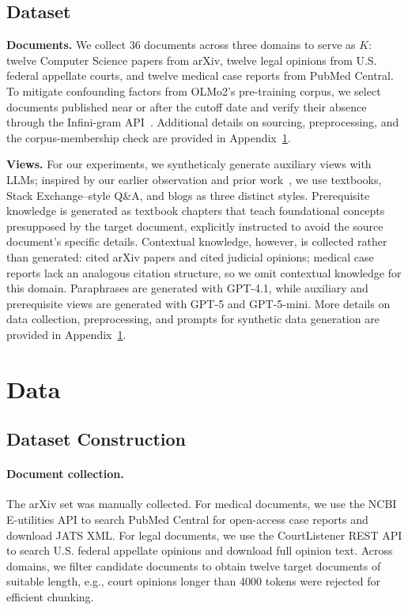 \subsection{Dataset}
\label{sec:dataset}

\textbf{Documents.}
We collect 36 documents across three domains to serve as $K$: twelve Computer Science papers from arXiv, twelve legal opinions from U.S. federal appellate courts, and twelve medical case reports from PubMed Central.  To mitigate confounding factors from OLMo2's pre-training corpus, we select documents published near or after the cutoff date and verify their absence through the Infini-gram API~\citep{liu2024infini}.  Additional details on sourcing, preprocessing, and the corpus-membership check are provided in Appendix~\ref{Appendix:preprocess}.

\textbf{Views.} For our experiments, we syntheticaly generate auxiliary views with LLMs; inspired by our earlier observation and prior work~\citep{gunasekar2023textbooks, allen2024physics, jiang2024instruction}, we use textbooks, Stack Exchange--style Q\&A, and blogs as three distinct styles. Prerequisite knowledge is generated as textbook chapters that teach foundational concepts presupposed by the target document, explicitly instructed to avoid the source document's specific details. Contextual knowledge, however, is collected rather than generated: cited arXiv papers and cited judicial opinions; medical case reports lack an analogous citation structure, so we omit contextual knowledge for this domain. Paraphrases are generated with GPT-4.1, while auxiliary and prerequisite views are generated with GPT-5 and GPT-5-mini. More details on data collection, preprocessing, and prompts for synthetic data generation are provided in Appendix~\ref{Appendix:preprocess}.
\appendix
\section{Data}
\label{Appendix:preprocess}

\subsection{Dataset Construction}

\paragraph{Document collection.} The arXiv set was manually collected.  For medical documents, we use the NCBI E-utilities API to search PubMed Central for open-access case reports and download JATS XML.  For legal documents, we use the CourtListener REST API to search U.S. federal appellate opinions and download full opinion text.  Across domains, we filter candidate documents to obtain twelve target documents of suitable length, e.g., court opinions longer than 4000 tokens were rejected for efficient chunking.

